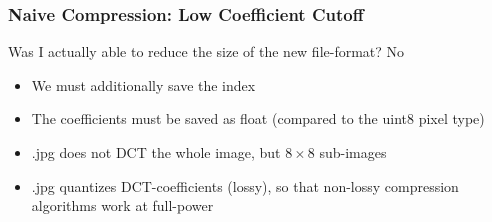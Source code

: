 \begin{frame}
    \frametitle{Naive Compression: Low Coefficient Cutoff}
    Was I actually able to reduce the size of the new file-format? \rightarrow No
    \begin{itemize}
        \item We must additionally save the index
        \item The coefficients must be saved as float (compared to the uint8 pixel type)
        \item .jpg does not DCT the whole image, but $8\times 8$ sub-images
        \item .jpg quantizes DCT-coefficients (lossy), so that non-lossy compression algorithms work at full-power
    \end{itemize}

\end{frame}